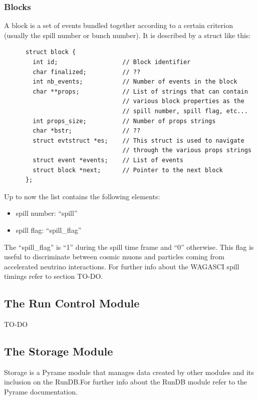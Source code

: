 \subsubsection{Blocks}
A block is a set of events bundled together according to a certain criterion
(usually the spill number or bunch number). It is described by a struct like
this:
\begin{lstlisting}
      struct block {
        int id;                  // Block identifier
        char finalized;          // ??
        int nb_events;           // Number of events in the block
        char **props;            // List of strings that can contain
                                 // various block properties as the
                                 // spill number, spill flag, etc...
        int props_size;          // Number of props strings
        char *bstr;              // ??
        struct evtstruct *es;    // This struct is used to navigate
                                 // through the various props strings
        struct event *events;    // List of events
        struct block *next;      // Pointer to the next block
      };
\end{lstlisting}
Up to now the  list contains the following elements:
\begin{itemize}
\item spill number: ``spill''
\item spill flag: ``spill\_flag''
\end{itemize}

The ``spill\_flag'' is ``1'' during the spill time frame and ``0''
otherwise. This flag is useful to discriminate between cosmic muons and
particles coming from accelerated neutrino interactions.  For further info about
the WAGASCI spill timings refer to section TO-DO.\@

\subsection{The Run Control Module}\label{sec:RC}

TO-DO

\subsection{The Storage Module}\label{sec:STORAGE}

Storage is a Pyrame module that manages data created by other modules and its
inclusion on the RunDB.\@ For further info about the RunDB module refer to the
Pyrame documentation.

